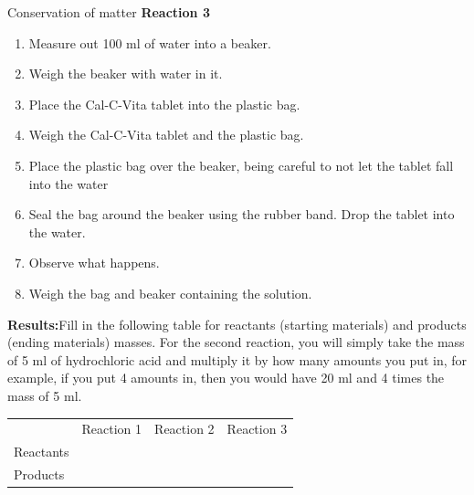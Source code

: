 \begin{g_experiment}{Conservation of matter}
\textbf{Reaction 3}
\label{m38711*id634223}\begin{enumerate}[noitemsep, label=\textbf{\arabic*}. ] 
            \item Measure out 100 ml of water into a beaker.\item Weigh the beaker with water in it.\item Place the Cal-C-Vita tablet into the plastic bag.\item Weigh the Cal-C-Vita tablet and the plastic bag.\item Place the plastic bag over the beaker, being careful to not let the tablet fall into the water\item Seal the bag around the beaker using the rubber band. Drop the tablet into the water.\item Observe what happens.\item Weigh the bag and beaker containing the solution.\end{enumerate}
        \par \label{m38711*eip-768}\noindent{}\textbf{Results:}Fill in the following table for reactants (starting materials) and products (ending materials) masses. For the second reaction, you will simply take the mass of 5 ml of hydrochloric acid and multiply it by how many amounts you put in, for example, if you put 4 amounts in, then you would have 20 ml and 4 times the mass of 5 ml. \par 
          \begin{table}[H]
        \begin{center}
      \label{m38711*eip-581}
    \noindent
      \tablelasttail{}
      \begin{xtabular}[t]{|l|l|l|l|}\hline
         &
        Reaction 1 &
        Reaction 2 &
        Reaction 3%
     \tabularnewline{}
        Reactants &
         &
         &
     \tabularnewline{}
        Products &

\end{xtabular}
\end{center}
\end{table}
\end{g_experiment}
